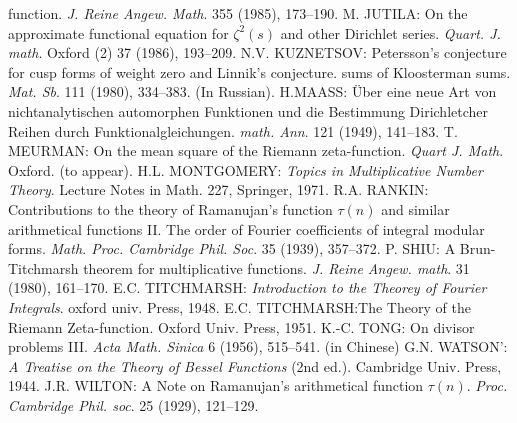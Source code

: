 \begin{thebibliography}{99}
  function. \emph{J. Reine Angew. Math}. 355 (1985), 173--190. 
 M. JUTILA: On the approximate functional equation for
  $\zeta^2(s)$ and other Dirichlet
  series. \emph{Quart. J. math}. Oxford (2) 37 (1986), 193--209. 
 N.V. KUZNETSOV: Petersson's conjecture for cusp forms
  of weight zero and Linnik's conjecture. sums of Kloosterman
  sums. \emph{Mat. Sb}. 111 (1980), 334--383. (In Russian). 
 H.\pageoriginale MAASS: \"Uber eine neue Art von
  nichtanalytischen automorphen Funktionen und die Bestimmung
  Dirichletcher Reihen durch
  Funktionalgleichungen. \emph{math. Ann}. 121 (1949), 141--183. 
 T. MEURMAN: On the mean square of the Riemann
  zeta-function. \emph{Quart J. Math}. Oxford. (to appear). 
 H.L. MONTGOMERY: \emph{Topics in Multiplicative Number
  Theory}. Lecture Notes in Math. 227, Springer, 1971. 
 R.A. RANKIN: Contributions to the theory of
  Ramanujan's function $\tau(n)$ and similar arithmetical functions
  II. The order of Fourier coefficients of integral modular
  forms. \emph{Math. Proc. Cambridge Phil. Soc}. 35 (1939), 357--372. 
 P. SHIU: A Brun-Titchmarsh theorem for multiplicative
  functions. \emph{J. Reine Angew. math}. 31 (1980), 161--170. 
 E.C. TITCHMARSH: \emph{Introduction to the Theorey of
  Fourier Integrals}. oxford univ. Press, 1948. 
 E.C. TITCHMARSH:{The Theory of the Riemann
  Zeta-function}. Oxford Univ. Press, 1951.
 K.-C. TONG: On divisor problems III. \emph{Acta
  Math. Sinica} 6 (1956), 515--541. (in Chinese) 
 G.N. WATSON': \emph{A Treatise on the Theory of Bessel
  Functions} (2nd ed.). Cambridge Univ. Press, 1944. 
 J.R. WILTON: A Note on Ramanujan's arithmetical
  function $\tau(n)$. \emph{Proc. Cambridge Phil. soc}. 25 (1929),
  121--129. 
\end{thebibliography}



 
